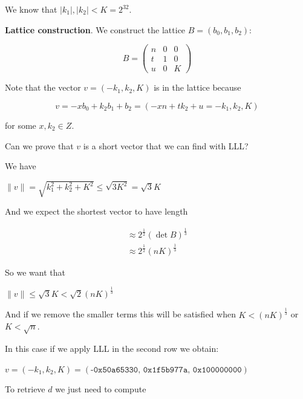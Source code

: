 \documentclass[a4paper,12pt]{report}
\begin{document}
We know that $|k_1|, |k_2| < K = 2^{32}$.

\vspace*{10px}

\textbf{Lattice construction}. We construct the lattice $B = (b_0, b_1, b_2)$:

\[
    B = 
    \begin{pmatrix}
        n & 0 & 0 \\
        t & 1 & 0 \\
        u & 0 & K
    \end{pmatrix}
\]

Note that the vector $v = (-k_1, k_2, K)$ is in the lattice because

\[
    v = -xb_0 + k_2b_1 + b_2 = (-xn + tk_2 + u = -k_1, k_2, K)
\]

for some $x, k_2 \in Z$.

\vspace*{10px}

Can we prove that $v$ is a short vector that we can find with LLL?

We have 

\begin{center}
    $\lVert v \rVert = \sqrt{k_1^2 + k_2^2 + K^2} \le \sqrt{3K^2} = \sqrt{3}K $
\end{center}

And we expect the shortest vector to have length

\[
    \begin{array}{c}
        \approx 2^{\frac{1}{2}}(\det B)^{\frac{1}{3}} \\
        \approx 2^{\frac{1}{2}}(nK)^{\frac{1}{3}}
    \end{array}
\]

So we want that 

\begin{center}
    $\lVert v \rVert \le \sqrt{3}K < \sqrt{2}(nK)^{\frac{1}{3}}$
\end{center}

And if we remove the smaller terms this will be satisfied when $K < (nK)^{\frac{1}{3}}$ or $K < \sqrt{n}$.

In this case if we apply LLL in the second row we obtain:

\begin{center}
    $v = (-k_1, k_2, K) = (\texttt{-0x50a65330, 0x1f5b977a, 0x100000000})$
\end{center}

To retrieve $d$ we just need to compute 
\end{document}
